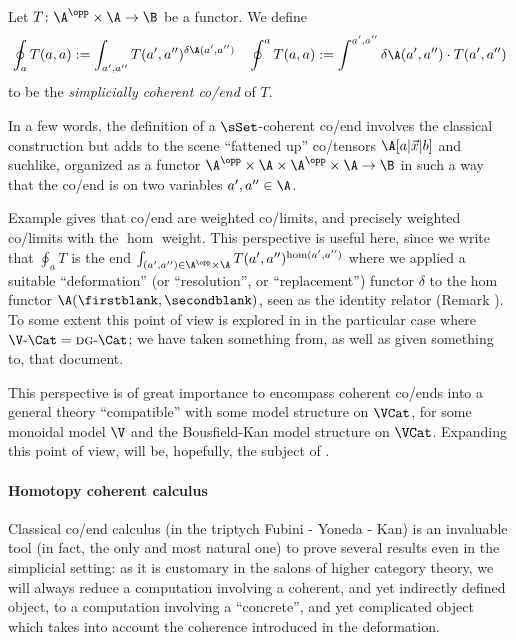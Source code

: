 \begin{definition}\label{cohcoend}
Let $T \colon \A^\opp\times \A \to \B$ be a functor. We define
\begin{gather}
\small
\oint_a T(a,a) := \int_{a',a''} T(a',a'')^{\delta \A(a', a'')} \quad
\oint^a T(a,a) := \int^{a',a''}\delta \A(a',a'') \cdot T(a',a'')
\end{gather}
to be the \emph{simplicially coherent co/end} of $T$.
\end{definition}
In a few words, the definition of a $\sSet$-coherent co/end involves the classical construction but adds to the scene ``fattened up'' co/tensors $\A[a|\vec x|b]$ and suchlike, organized as a functor $ \A^\opp\times \A \times \A^\opp\times \A \to \B$ in such a way that the co/end is on two variables $a',a'' \in \A$.
\begin{remark}
Example  gives that co/end are weighted co/limits, and precisely weighted co/limits with the $\hom$ weight. This perspective is useful here, since we write that $\oint_a T$ is the end $\int_{(a',a'')\in \A^\opp\times \A} T(a',a'')^{\hom(a',a'')}$ where we applied a suitable ``deformation'' (or ``resolution'', or ``replacement'') functor $\delta$ to the hom functor $\A(\firstblank,\secondblank)$, seen as the identity relator (Remark ). To some extent this point of view is explored in \cite{nashphd} in the particular case where $\V\text{-}\Cat = \textsc{dg}\text{-}\Cat$; we have taken something from, as well as given something to, that document. 

This perspective is of great importance to encompass coherent co/ends into a general theory ``compatible'' with some model structure on $\VCat$, for some monoidal model $\V$ and the Bousfield-Kan model structure on $\VCat$. Expanding this point of view, will be, hopefully, the subject of \cite{inftycoends}.
\end{remark}

\paragraph{\bf Homotopy coherent calculus}
Classical co/end calculus (in the triptych Fubini - Yoneda - Kan) is an invaluable tool (in fact, the only and most natural one) to prove several results even in the simplicial setting: as it is customary in the salons of higher category theory, we will always reduce a computation involving a coherent, and yet indirectly defined object, to a computation involving a ``concrete'', and yet complicated object which takes into account the coherence introduced in the deformation.

